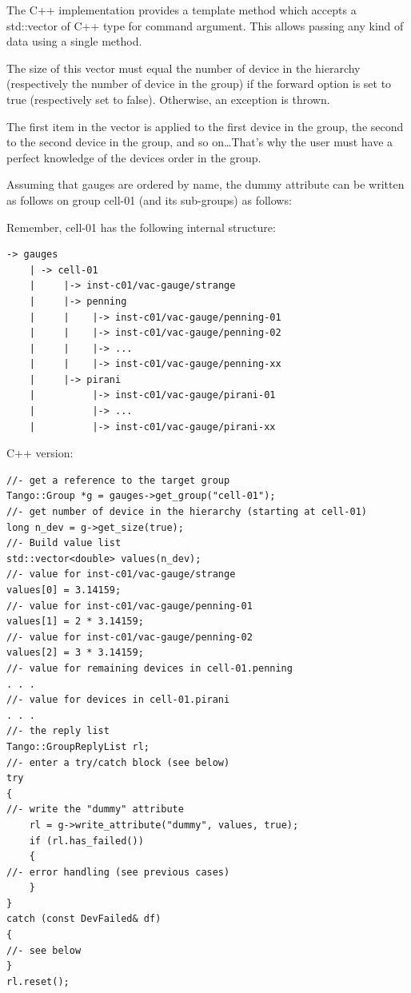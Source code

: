 The C++ implementation provides a template method which accepts a
std::vector of \textquotedbl{}C++ type for command argument\textquotedbl{}.
This allows passing any kind of data using a single method.

The size of this vector must equal the number of device in the hierarchy
(respectively the number of device in the group) if the forward
option is set to true (respectively set to false). Otherwise, an exception
is thrown.

The first item in the vector is applied to the first device in the
group, the second to the second device in the group, and so on\ldots{}That's
why the user must have a \textquotedbl{}perfect\textquotedbl{} knowledge
of the devices order in the group. 

Assuming that gauges are ordered by name, the dummy attribute can
be written as follows on group \textquotedbl{}cell-01\textquotedbl{}
(and its sub-groups) as follows:

Remember, \textquotedbl{}cell-01\textquotedbl{} has the following
internal structure: 
\begin{verbatim}
-> gauges 
    | -> cell-01
    |     |-> inst-c01/vac-gauge/strange
    |     |-> penning
    |     |    |-> inst-c01/vac-gauge/penning-01
    |     |    |-> inst-c01/vac-gauge/penning-02
    |     |    |-> ...
    |     |    |-> inst-c01/vac-gauge/penning-xx
    |     |-> pirani
    |          |-> inst-c01/vac-gauge/pirani-01
    |          |-> ...
    |          |-> inst-c01/vac-gauge/pirani-xx
\end{verbatim}
C++ version:


\begin{verbatim}
//- get a reference to the target group
Tango::Group *g = gauges->get_group("cell-01");
//- get number of device in the hierarchy (starting at cell-01)
long n_dev = g->get_size(true);
//- Build value list
std::vector<double> values(n_dev);
//- value for inst-c01/vac-gauge/strange
values[0] = 3.14159;
//- value for inst-c01/vac-gauge/penning-01
values[1] = 2 * 3.14159;
//- value for inst-c01/vac-gauge/penning-02
values[2] = 3 * 3.14159;
//- value for remaining devices in cell-01.penning
. . .
//- value for devices in cell-01.pirani
. . .
//- the reply list
Tango::GroupReplyList rl;
//- enter a try/catch block (see below)
try
{
//- write the "dummy" attribute
    rl = g->write_attribute("dummy", values, true);
    if (rl.has_failed())
    {
//- error handling (see previous cases)
    }
}
catch (const DevFailed& df)
{
//- see below
}
rl.reset();
\end{verbatim}


